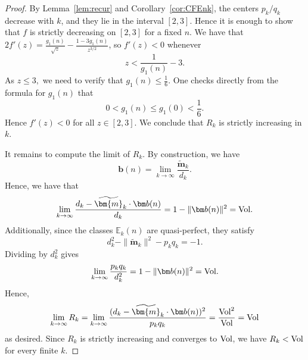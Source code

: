 \documentclass[11pt, reqno]{amsart}
\theoremstyle{remark}
\numberwithin{equation}{subsection}
\numberwithin{figure}{section}
\theoremstyle{customremark}
\newcommand{\Vol}{{\rm Vol}}
\newcommand{\bE}{{\mathbb E}}
\newcommand{\btm}{\widetilde{\bm{m}}}
\begin{document}
\begin{proof}
By Lemma~\ref{lem:recur} and Corollary~\ref{cor:CFEnk}, the centers $p_k/q_k$ decrease with $k$, and they lie in the interval $[2,3]$. Hence it is enough to show that $f$ is strictly decreasing on $[2,3]$ for a fixed $n$. We have that $2f'(z)=\frac{g_1(n)}{\sqrt{z}}-\frac{1-3g_1(n)}{z^{3/2}}$, so $f'(z) <0$ whenever
\[   z  < \frac{1}{g_1(n)}-3. \]
As $z \leq 3,$ we need to verify that $g_1(n) \leq \frac{1}{6}.$ One checks directly from the formula for $g_1(n)$ that
\[0<g_1(n)\leq g_1(0)<\frac16.\]
Hence $f'(z)<0$ for all $z\in[2,3]$. We conclude that $R_k$ is strictly increasing in $k.$ 

It remains to compute the limit of $R_k$. By construction, we have
\[ \bm b(n)=\lim_{k\to\infty}\frac{\btm_k}{d_k}.\]
Hence, we have that 
\[ \lim_{k\to\infty}\frac{d_k-\btm_k\cdot\bm b(n)}{d_k}=
1-\|\bm b(n)\|^2=\Vol.\]
Additionally, since the classes $\bE_k(n)$ are quasi-perfect, they satisfy
\[d_k^2-\|\btm_k\|^2-p_kq_k=-1.\]
Dividing by $d_k^2$ gives
\[ \lim_{k\to\infty}\frac{p_kq_k}{d_k^2}= 
1-\|\bm b(n)\|^2=\Vol.\]
Hence,
\[ \lim_{k \to \infty} R_k=\lim_{k\to\infty}
        \frac{(d_k-\btm_k\cdot\bm b(n))^2}{p_kq_k}=\frac{\Vol^2}{\Vol}=\Vol\]
        as desired. 
Since $R_k$ is strictly increasing and converges to $\Vol$, we have $R_k<\Vol$ for every finite $k$.
\end{proof}
\end{document}
